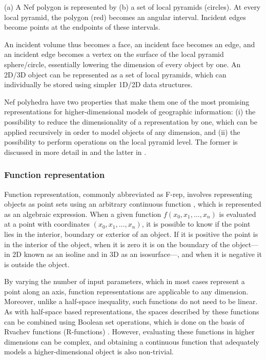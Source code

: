 {\caption[A Nef polygon represented by a set of local pyramids]{(a) A Nef polygon is represented by (b) a set of local pyramids (circles). At every local pyramid, the polygon (red) becomes an angular interval. Incident edges become points at the endpoints of these intervals.}
\label{fig:nef}
}
An incident volume thus becomes a face, an incident face becomes an edge, and an incident edge becomes a vertex on the surface of the local pyramid sphere/circle, essentially lowering the dimension of every object by one.
An 2D/3D object can be represented as a set of local pyramids, which can individually be stored using simpler 1D/2D data structures.

Nef polyhedra have two properties that make them one of the most promising representations for higher-dimensional models of geographic information: (i) the possibility to reduce the dimensionality of a representation by one, which can be applied recursively in order to model objects of any dimension, and (ii) the possibility to perform operations on the local pyramid level.
The former is discussed in more detail in  and the latter in .

\subsubsection{Function representation}

Function representation, commonly abbreviated as F-rep, involves representing objects as point sets using an arbitrary continuous function \citep{Pasko95}, which is represented as an algebraic expression.
When a given function $f(x_0, x_1, \ldots, x_n)$ is evaluated at a point with coordinates $(x_0, x_1, \ldots, x_n)$, it is possible to know if the point lies in the interior, boundary or exterior of an object.
If it is positive the point is in the interior of the object, when it is zero it is on the boundary of the object---in 2D known as an isoline and in 3D as an isosurface---, and when it is negative it is outside the object.

By varying the number of input parameters, which in most cases represent a point along an axis, function representations are applicable to any dimension.
Moreover, unlike a half-space inequality, such functions do not need to be linear.
As with half-space based representations, the spaces described by these functions can be combined using Boolean set operations, which is done on the basis of Rvachev functions (R-functions) \citep{Rvachev63}.
However, evaluating these functions in higher dimensions can be complex, and obtaining a continuous function that adequately models a higher-dimensional object is also non-trivial.

